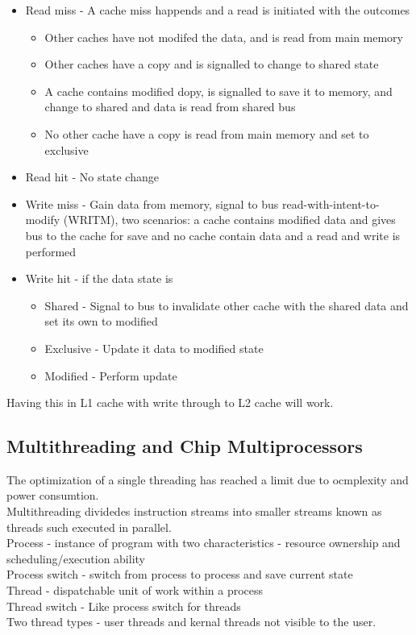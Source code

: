 \documentclass[12pt, a4paper]{article}
\begin{document}
				\begin{itemize}
					\item Read miss - A cache miss happends and a read is initiated with the outcomes
					\begin{itemize}
						\item Other caches have not modifed the data, and is read from main memory
						\item Other caches have a copy and is signalled to change to shared state
						\item A cache contains modified dopy, is signalled to save it to memory, and change to shared and data is read from shared bus
						\item No other cache have a copy is read from main memory and set to exclusive
					\end{itemize}
					\item Read hit - No state change
					\item Write miss - Gain data from memory, signal to bus read-with-intent-to-modify (WRITM), two scenarios: a cache contains modified data and gives bus to the cache for save and no cache contain data and a read and write is performed
					\item Write hit - if the data state is
					\begin{itemize}
						\item Shared - Signal to bus to invalidate other cache with the shared data and set its own to modified
						\item Exclusive  - Update it data to modified state
						\item Modified - Perform update
					\end{itemize}
				\end{itemize}
				Having this in L1 cache with write through to L2 cache will work.
		\subsection{Multithreading and Chip Multiprocessors}
			The optimization of a single threading has reached a limit due to ocmplexity and power consumtion.\\
			Multithreading dividedes instruction streams into smaller streams known as threads such executed in parallel.\\
			Process - instance of program with two characteristics - resource ownership and scheduling/execution  ability\\
			Process switch - switch from process to process and save current state\\
			Thread - dispatchable unit of work within a process\\
			Thread switch - Like process switch for threads\\
			Two thread types - user threads and kernal threads not visible to the user.\\
\end{document}
